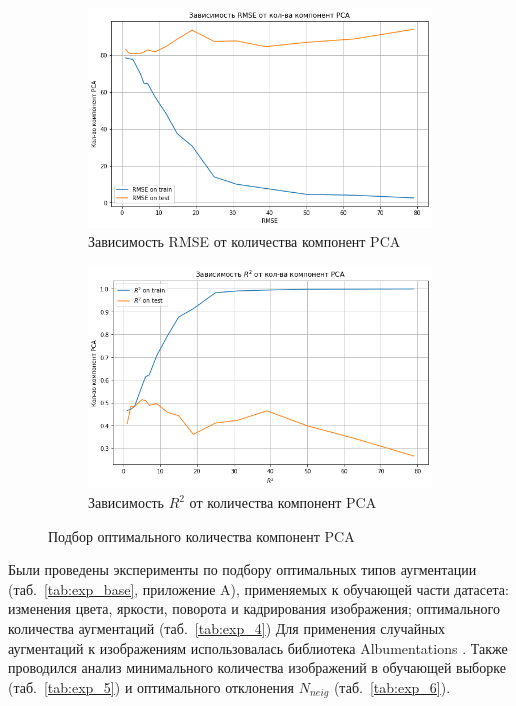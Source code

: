 \documentclass[a4paper,14pt]{article}
\begin{document}
    \begin{figure}[H]
        \centering
        \begin{subfigure}{.5\textwidth}
            \centering
            \includegraphics[width=\linewidth]{images/pca_rmse}
            \caption{Зависимость RMSE от количества компонент PCA}
            \label{fig:pca_rmse}
        \end{subfigure}%
        \begin{subfigure}{.5\textwidth}
            \centering
            \includegraphics[width=\linewidth]{images/pca_r2}
            \caption{Зависимость $R^2$ от количества компонент PCA}
            \label{fig:pca_r2}
        \end{subfigure}
        \caption{Подбор оптимального количества компонент PCA}
        \label{fig:pca_optim}
    \end{figure}

    Были проведены эксперименты по подбору оптимальных типов аугментации (таб.~\ref{tab:exp_base}, приложение A), применяемых к обучающей части датасета: изменения цвета, яркости, поворота и кадрирования изображения; оптимального количества аугментаций (таб.~\ref{tab:exp_4})
    Для применения случайных аугментаций к изображениям использовалась библиотека Albumentations \cite{albumentations}.
	Также проводился анализ минимального количества изображений в обучающей выборке (таб.~\ref{tab:exp_5}) и оптимального отклонения $N_{neig}$ (таб.~\ref{tab:exp_6}).
\end{document}

